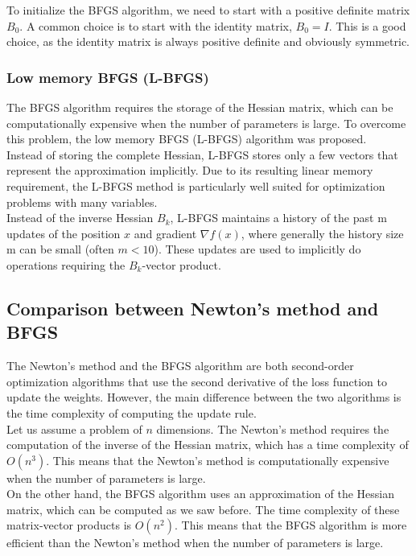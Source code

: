 To initialize the BFGS algorithm, we need to start with a positive definite matrix $B_0$. A common
choice is to start with the identity matrix, $B_0 = I$. This is a good choice, as the identity matrix
is always positive definite and obviously symmetric.

\subsubsection{Low memory BFGS (L-BFGS)}

The BFGS algorithm requires the storage of the Hessian matrix, which can be computationally expensive
when the number of parameters is large. To overcome this problem, the low memory BFGS (L-BFGS) algorithm
was proposed.\\

Instead of storing the complete Hessian, L-BFGS stores only a few vectors that represent the approximation 
implicitly. Due to its resulting linear memory requirement, the L-BFGS method is particularly well suited 
for optimization problems with many variables.\\

Instead of the inverse Hessian $B_k$, L-BFGS maintains a history of the past m updates of the 
position $x$ and gradient $\nabla f(x)$, where generally the history size m 
can be small (often $m < 10$). These updates are used to implicitly do operations requiring 
the $B_k$-vector product.

\subsection{Comparison between Newton's method and BFGS}

The Newton's method and the BFGS algorithm are both second-order optimization algorithms that use the
second derivative of the loss function to update the weights. However, the main difference between the
two algorithms is the time complexity of computing the update rule.\\

Let us assume a problem of $n$ dimensions. The Newton's method requires the computation of the inverse
of the Hessian matrix, which has a time complexity of $O(n^3)$. This means that the Newton's method is
computationally expensive when the number of parameters is large.\\

On the other hand, the BFGS algorithm uses an approximation of the Hessian matrix, which can be computed
as we saw before. The time complexity of these matrix-vector products is $O(n^2)$. This means that the
BFGS algorithm is more efficient than the Newton's method when the number of parameters is large.\\

